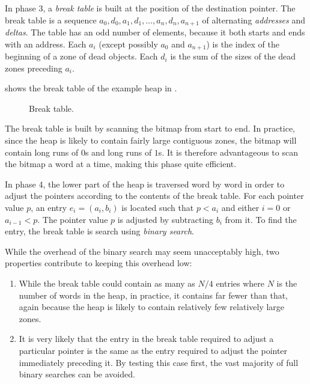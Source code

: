 In phase 3, a \emph{break table} is built at the position of the
destination pointer.  The break table is a sequence $a_0, d_0, a_1,
d_1, \ldots, a_n, d_n, a_{n+1}$ of alternating \emph{addresses} and
\emph{deltas}.  The table has an odd number of elements, because it
both starts and ends with an address.  Each $a_i$ (except possibly
$a_0$ and $a_{n+1}$) is the index of the beginning of a zone of dead
objects.  Each $d_i$ is the sum of the sizes of the dead zones
preceding $a_i$.

 shows the break table of the example heap in
.

\begin{figure}
\begin{center}
\end{center}
\caption{\label{fig-example-d}
Break table.}
\end{figure}

The break table is built by scanning the bitmap from start to end.  In
practice, since the heap is likely to contain fairly large contiguous
zones, the bitmap will contain long runs of $0$s and long runs of
$1$s.  It is therefore advantageous to scan the bitmap a word at a
time, making this phase quite efficient. 

In phase 4, the lower part of the heap is traversed word by word in
order to adjust the pointers according to the contents of the break
table.  For each pointer value $p$, an entry $e_i = (a_i,b_i)$ is
located such that $p < a_i$ and either $i = 0$ or $a_{i-1} < p$.  The
pointer value $p$ is adjusted by subtracting $b_i$ from it.  To find
the entry, the break table is search using \emph{binary search}.

While the overhead of the binary search may seem unacceptably high,
two properties contribute to keeping this overhead low:

\begin{enumerate}
\item While the break table could contain as many as $N/4$ entries
  where $N$ is the number of words in the heap, in practice, it
  contains far fewer than that, again because the heap is likely to
  contain relatively few relatively large zones.
\item It is very likely that the entry in the break table required to
  adjust a particular pointer is the same as the entry required to
  adjust the pointer immediately preceding it.  By testing this case
  first, the vast majority of full binary searches can be avoided.
\end{enumerate}
